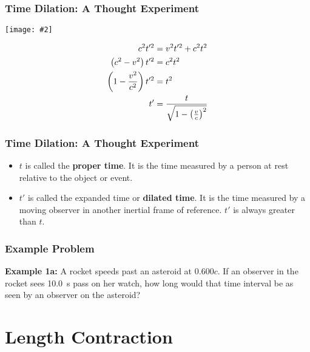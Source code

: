 \documentclass[12pt,compress,aspectratio=169]{beamer}
\newcommand{\pic}[2]{\texttt{[image: \#2]}}
\newcommand{\bigsqrt}{\ensuremath\sqrt{1-\left(\frac{v}{c}\right)^2}}
\newcommand{\eq}[2]{\vspace{#1}{\Large\begin{displaymath}#2\end{displaymath}}}
\begin{document}
\begin{frame}
  \frametitle{Time Dilation: A Thought Experiment}
  \begin{center}
    \pic{.7}{graphics/dilation.png}
  \end{center}
  \begin{align*}
    c^2t'^2 &=v^2t'^2 + c^2t^2\\
    \left(c^2-v^2\right)t'^2 &=c^2t^2\\
    \left(1-\frac{v^2}{c^2}\right)t'^2 &=t^2\\
    t' &=\frac{t}{\bigsqrt}
  \end{align*}
\end{frame}


\begin{frame}
  \frametitle{Time Dilation: A Thought Experiment}
  
  \eq{-.2in}{
    \boxed{t' =\frac{t}{\bigsqrt}}
  }
  \begin{itemize}
  \item $t$ is called the \textbf{proper time}. It is the time measured
    by a person at rest relative to the object or event.
  \item $t'$ is called the expanded time or \textbf{dilated time}. It is 
    the time measured by a moving observer in another inertial frame of
    reference.
    $t'$ is always greater than $t$.
  \end{itemize}
\end{frame}

\begin{frame}
  \frametitle{Example Problem}
  \textbf{Example 1a:} A rocket speeds past an asteroid at $0.600c$. If an
  observer in the rocket sees \SI{10.0}{s} pass on her watch, how long would
  that time interval be as seen by an observer on the asteroid?


\end{frame}


\section{Length Contraction}
\end{document}
